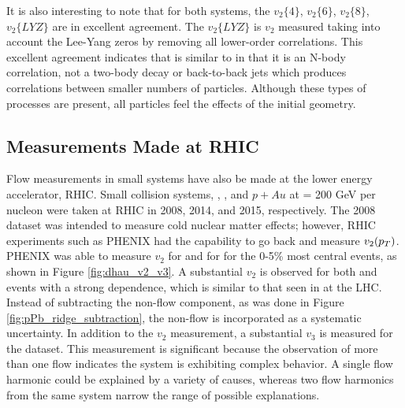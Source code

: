 It is also interesting to note that for both systems, the $v_2\{4\}$, $v_2\{6\}$, $v_2\{8\}$, $v_2\{LYZ\}$ are in excellent agreement. The $v_2\{LYZ\}$ is $v_2$ measured taking into account the Lee-Yang zeros by removing all lower-order correlations. This excellent agreement indicates that \ppb is similar to \pbpb in that it is an N-body correlation, not a two-body decay or back-to-back jets which produces correlations between smaller numbers of particles. Although these types of processes are present, all particles feel the effects of the initial geometry.

\subsection{Measurements Made at RHIC}
Flow measurements in small systems have also be made at the lower energy accelerator, RHIC. Small collision systems, \dau, \hau, and $p+Au$ at \sqsn = 200 GeV per nucleon were taken at RHIC in 2008, 2014, and 2015, respectively. The 2008 \dau dataset was intended to measure cold nuclear matter effects; however, RHIC experiments such as PHENIX had the capability to go back and measure $v_2(\mbox{$p_T$})$. PHENIX was able to measure $v_2$ for \dau and for \hau for the 0-5\% most central events, as shown in Figure \ref{fig:dhau_v2_v3}. A substantial $v_2$ is observed for both \dau and \hau events with a strong \pt dependence, which is similar to that seen in \ppb at the LHC. Instead of subtracting the non-flow component, as was done in Figure \ref{fig:pPb_ridge_subtraction}, the non-flow is incorporated as a systematic uncertainty. In addition to the $v_2$ measurement, a substantial $v_3$ is measured for the \hau dataset. This measurement is significant because the observation of more than one flow indicates the system is exhibiting complex behavior. A single flow harmonic could be explained by a variety of causes, whereas two flow harmonics from the same system narrow the range of possible explanations.

